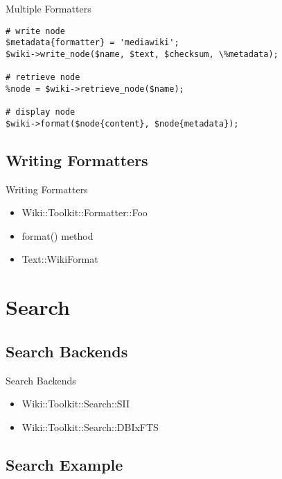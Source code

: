 \begin{frame}[fragile]{Multiple Formatters}
\begin{lstlisting}
# write node
$metadata{formatter} = 'mediawiki';
$wiki->write_node($name, $text, $checksum, \%metadata);

# retrieve node
%node = $wiki->retrieve_node($name);

# display node
$wiki->format($node{content}, $node{metadata});
\end{lstlisting}
\end{frame}

\subsection{Writing Formatters}


\begin{frame}{Writing Formatters}
 \begin{itemize}
   \item<1-> Wiki::Toolkit::Formatter::Foo
   \item<2-> format() method
   \item<3-> Text::WikiFormat
 \end{itemize}
\end{frame}

\section{Search}

\subsection{Search Backends}


\begin{frame}{Search Backends}
 \begin{itemize}
  \item Wiki::Toolkit::Search::SII
  \item Wiki::Toolkit::Search::DBIxFTS
 \end{itemize}
\end{frame}
\subsection{Search Example}


